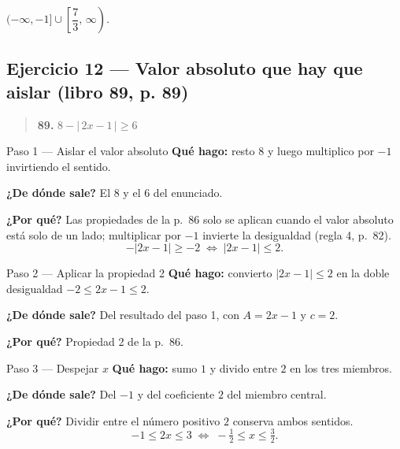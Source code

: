 \documentclass[11pt]{article}
\begin{document}
\begin{resp}
$(-\infty,-1]\cup\left[\dfrac73,\,\infty\right)$.
\end{resp}

\subsection*{Ejercicio 12 --- Valor absoluto que hay que aislar (libro 89, p. 89)}

\begin{quote}
\textbf{89.} $8-|\,2x-1\,|\ge 6$
\end{quote}

\begin{paso}{Paso 1 --- Aislar el valor absoluto}
\textbf{Qué hago:} resto $8$ y luego multiplico por $-1$ invirtiendo el sentido.

\textbf{¿De dónde sale?} El $8$ y el $6$ del enunciado.

\textbf{¿Por qué?} Las propiedades de la p.~86 solo se aplican cuando el valor absoluto está solo de un lado; multiplicar por $-1$ invierte la desigualdad (regla 4, p.~82).
\[
-|2x-1|\ge -2 \;\Longleftrightarrow\; |2x-1|\le 2.
\]
\end{paso}

\begin{paso}{Paso 2 --- Aplicar la propiedad 2}
\textbf{Qué hago:} convierto $|2x-1|\le 2$ en la doble desigualdad $-2\le 2x-1\le 2$.

\textbf{¿De dónde sale?} Del resultado del paso 1, con $A=2x-1$ y $c=2$.

\textbf{¿Por qué?} Propiedad 2 de la p.~86.
\end{paso}

\begin{paso}{Paso 3 --- Despejar $x$}
\textbf{Qué hago:} sumo $1$ y divido entre $2$ en los tres miembros.

\textbf{¿De dónde sale?} Del $-1$ y del coeficiente $2$ del miembro central.

\textbf{¿Por qué?} Dividir entre el número positivo $2$ conserva ambos sentidos.
\[
-1\le 2x\le 3 \;\Longleftrightarrow\; -\tfrac12\le x\le \tfrac32.
\]
\end{paso}

\begin{center}
\end{center}
\end{document}
